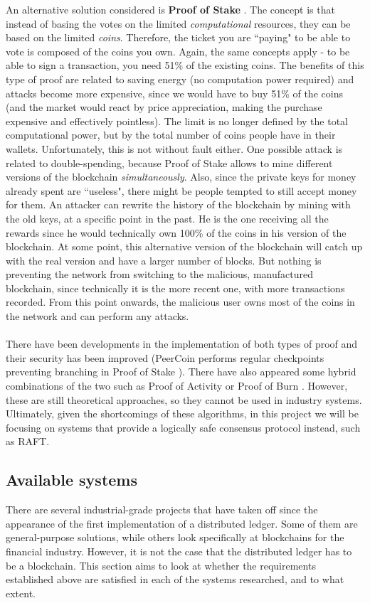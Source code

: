\documentclass[12pt,twoside]{article}
\begin{document}
An alternative solution considered is \textbf{Proof of Stake} \cite{PWPS}. The concept is that instead of basing the votes on the limited \textit{computational} resources, they can be based on the limited \textit{coins}. Therefore, the ticket you are ``paying" to be able to vote is composed of the coins you own. Again, the same concepts apply - to be able to sign a transaction, you need 51\% of the existing coins. The benefits of this type of proof are related to saving energy (no computation power required) and attacks become more expensive, since we would have to buy 51\% of the coins (and the market would react by price appreciation, making the purchase expensive and effectively pointless). The limit is no longer defined by the total computational power, but by the total number of coins people have in their wallets. Unfortunately, this is not without fault either. One possible attack is related to double-spending, because Proof of Stake allows to mine different versions of the blockchain \textit{simultaneously}. Also, since the private keys for money already spent are ``useless", there might be people tempted to still accept money for them. An attacker can rewrite the history of the blockchain by mining with the old keys, at a specific point in the past. He is the one receiving all the rewards since he would technically own 100\% of the coins in his version of the blockchain. At some point, this alternative version of the blockchain will catch up with the real version and have a larger number of blocks. But nothing is preventing the network from switching to the malicious, manufactured blockchain, since technically it is the more recent one, with more transactions recorded. From this point onwards, the malicious user owns most of the coins in the network and can perform any attacks.
\\ \\
There have been developments in the implementation of both types of proof and their security has been improved (PeerCoin performs regular checkpoints preventing branching in Proof of Stake \cite{PWPS}). There have also appeared some hybrid combinations of the two such as Proof of Activity or Proof of Burn \cite{PAPB}. However, these are still theoretical approaches, so they cannot be used in industry systems. Ultimately, given the shortcomings of these algorithms, in this project we will be focusing on systems that provide a logically safe consensus protocol instead, such as RAFT.
\subsection{Available systems} 
\label{sub:AvailableSystems}
There are several industrial-grade projects that have taken off since the appearance of the first implementation of a distributed ledger. Some of them are general-purpose solutions, while others look specifically at blockchains for the financial industry. However, it is not the case that the distributed ledger has to be a blockchain. This section aims to look at whether the requirements established above are satisfied in each of the systems researched, and to what extent. 
\end{document}
